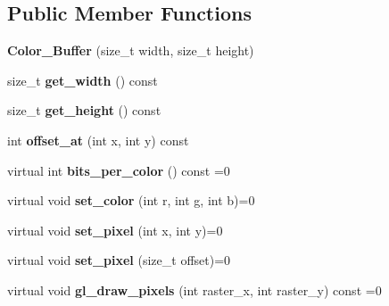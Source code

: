\subsection*{Public Member Functions}
\begin{DoxyCompactItemize}
\item 
\mbox{\label{class_project1__3_d_a_1_1_color___buffer_aac516b4733b3a4ba40e9ee276c0961da}} 
{\bfseries Color\+\_\+\+Buffer} (size\+\_\+t width, size\+\_\+t height)
\item 
\mbox{\label{class_project1__3_d_a_1_1_color___buffer_a149d610d7c47596b579811b60e17b3dc}} 
size\+\_\+t {\bfseries get\+\_\+width} () const
\item 
\mbox{\label{class_project1__3_d_a_1_1_color___buffer_a05fabe3e2e2c8be4ff3cef9c2154c65a}} 
size\+\_\+t {\bfseries get\+\_\+height} () const
\item 
\mbox{\label{class_project1__3_d_a_1_1_color___buffer_a4a07d9dfd667ad929bcb19126ffc1767}} 
int {\bfseries offset\+\_\+at} (int x, int y) const
\item 
\mbox{\label{class_project1__3_d_a_1_1_color___buffer_a212480c556eca43c800598df81ffe498}} 
virtual int {\bfseries bits\+\_\+per\+\_\+color} () const =0
\item 
\mbox{\label{class_project1__3_d_a_1_1_color___buffer_aa9cde2cfd3b21d753fbbfe8f622dd600}} 
virtual void {\bfseries set\+\_\+color} (int r, int g, int b)=0
\item 
\mbox{\label{class_project1__3_d_a_1_1_color___buffer_a744e79f2842b3907de200b36c63c34c5}} 
virtual void {\bfseries set\+\_\+pixel} (int x, int y)=0
\item 
\mbox{\label{class_project1__3_d_a_1_1_color___buffer_ae0f63263657865de1707dcf60e0f175d}} 
virtual void {\bfseries set\+\_\+pixel} (size\+\_\+t offset)=0
\item 
\mbox{\label{class_project1__3_d_a_1_1_color___buffer_ab2f5cd89916b791d935ce69fcccce7f6}} 
virtual void {\bfseries gl\+\_\+draw\+\_\+pixels} (int raster\+\_\+x, int raster\+\_\+y) const =0
\end{DoxyCompactItemize}

